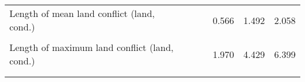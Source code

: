 \begin{tabular}{lcccccc}
\noalign{\smallskip}Length of mean land conflict (land, cond.) &  &  &  & 0.566 & 1.492 & 2.058\\
 & \begin{footnotesize}\end{footnotesize} & \begin{footnotesize}\end{footnotesize} & \begin{footnotesize}\end{footnotesize} & \begin{footnotesize}[1.039]\end{footnotesize} & \begin{footnotesize}[1.832]\end{footnotesize} & \begin{footnotesize}[1.685]\end{footnotesize}\\
\noalign{\smallskip}Length of maximum land conflict (land, cond.) &  &  &  & 1.970 & 4.429 & 6.399\\
 & \begin{footnotesize}\end{footnotesize} & \begin{footnotesize}\end{footnotesize} & \begin{footnotesize}\end{footnotesize} & \begin{footnotesize}[3.116]\end{footnotesize} & \begin{footnotesize}[5.447]\end{footnotesize} & \begin{footnotesize}[5.146]\end{footnotesize}\\
\noalign{\smallskip}\hline\end{tabular}\\
